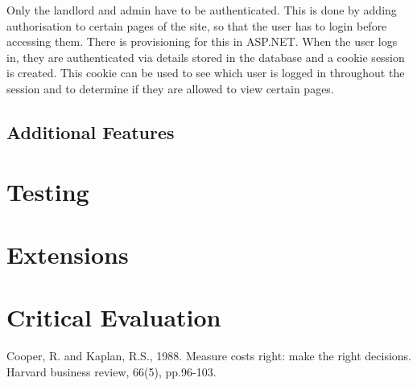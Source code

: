\documentclass{article}
\begin{document}
        \par
            Only the landlord and admin have to be authenticated.
            This is done by adding authorisation to certain pages of the site, so that the user has to login before accessing them.
            There is provisioning for this in ASP.NET.
            When the user logs in, they are authenticated via details stored in the database and a cookie session is created.
            This cookie can be used to see which user is logged in throughout the session and to determine if they are allowed to view certain pages.

    \subsection{Additional Features}

\section{Testing}

\section{Extensions}

\section{Critical Evaluation}

\begin{thebibliography}{1}
        Cooper, R. and Kaplan, R.S., 1988. Measure costs right: make the right decisions. Harvard business review, 66(5), pp.96-103.
\end{thebibliography}
\end{document}
